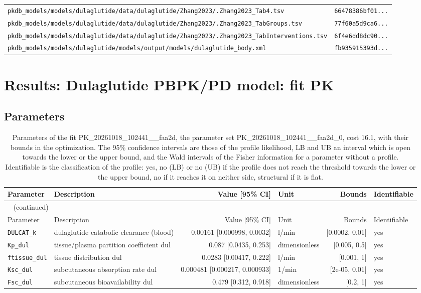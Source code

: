 \documentclass{article}
\begin{document}
\begin{longtable}{ll}
\texttt{pkdb\_models/models/dulaglutide/data/dulaglutide/Zhang2023/.Zhang2023\_Tab4.tsv} & \texttt{66478386bf01...} \\
\texttt{pkdb\_models/models/dulaglutide/data/dulaglutide/Zhang2023/.Zhang2023\_TabGroups.tsv} & \texttt{77f60a5d9ca6...} \\
\texttt{pkdb\_models/models/dulaglutide/data/dulaglutide/Zhang2023/.Zhang2023\_TabInterventions.tsv} & \texttt{6f4e6dd8dc90...} \\
\texttt{pkdb\_models/models/dulaglutide/models/output/models/dulaglutide\_body.xml} & \texttt{fb935915393d...} \\
\end{longtable}

\section{Results: Dulaglutide PBPK/PD model: fit PK}

\subsection{Parameters}

\begin{longtable}{llrlrl}
\caption{Parameters of the fit PK\_20261018\_102441\_\_faa2d, the parameter set PK\_20261018\_102441\_\_faa2d\_0, cost 16.1, with their bounds in the optimization. The 95\% confidence intervals are those of the profile likelihood, LB and UB an interval which is open towards the lower or the upper bound, and the Wald intervals of the Fisher information for a parameter without a profile. Identifiable is the classification of the profile: yes, no (LB) or no (UB) if the profile does not reach the threshold towards the lower or the upper bound, no if it reaches it on neither side, structural if it is flat.}\label{tab:parameters:PK_20261018_102441__faa2d} \\
\toprule
Parameter & Description & Value [95\% CI] & Unit & Bounds & Identifiable \\
\midrule
\endfirsthead
\multicolumn{6}{l}{\small\tablename~\thetable{} (continued)} \\
\toprule
Parameter & Description & Value [95\% CI] & Unit & Bounds & Identifiable \\
\midrule
\endhead
\bottomrule
\endlastfoot
\texttt{DULCAT\_k} & dulaglutide catabolic clearance (blood) & 0.00161 [0.000998, 0.0032] & l/min & [0.0002, 0.01] & yes \\
\texttt{Kp\_dul} & tissue/plasma partition coefficient dul & 0.087 [0.0435, 0.253] & dimensionless & [0.005, 0.5] & yes \\
\texttt{ftissue\_dul} & tissue distribution dul & 0.0283 [0.00417, 0.222] & l/min & [0.001, 1] & yes \\
\texttt{Ksc\_dul} & subcutaneous absorption rate dul & 0.000481 [0.000217, 0.000933] & 1/min & [2e-05, 0.01] & yes \\
\texttt{Fsc\_dul} & subcutaneous bioavailability dul & 0.479 [0.312, 0.918] & dimensionless & [0.2, 1] & yes \\
\end{longtable}
\end{document}

